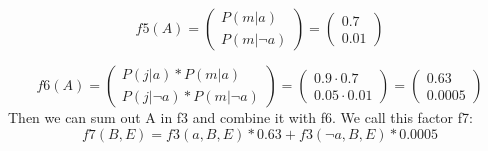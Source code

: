 \documentclass[11pt]{article}
\begin{document}
$$ f5(A) = 
\begin{pmatrix}
  P(m|a) \\
  P(m|\neg a)
\end{pmatrix}
 = 
\begin{pmatrix}
  0.7 \\
  0.01
\end{pmatrix}
$$ 

$$ f6(A) = 
\begin{pmatrix}
  P(j|a)*P(m|a) \\
  P(j|\neg a)*P(m|\neg a)
\end{pmatrix}
 = 
\begin{pmatrix}
  0.9 \cdot 0.7 \\
  0.05 \cdot 0.01
\end{pmatrix}
 = 
\begin{pmatrix}
  0.63 \\
  0.0005
\end{pmatrix}
$$ 
Then we can sum out A in f3 and combine it with f6. We call this factor f7:
$$
  f7(B,E) = f3(a,B,E) * 0.63 + f3(\neg a,B,E) * 0.0005
$$
\end{document}
